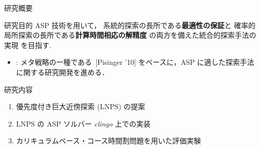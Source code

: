 \documentclass[11pt,dvipdfmx]{beamer}
\begin{document}
\begin{frame}{研究概要}
  \begin{alertblock}{研究目的}\centering
    ASP 技術を用いて，
   系統的探索の長所である\alert{\bf 最適性の保証}と
   確率的局所探索の長所である\alert{\bf 計算時間相応の解精度}
   の両方を備えた統合的探索手法の実現
   を目指す.
  \end{alertblock}

  \begin{itemize}
  \item {}:
    メタ戦略の一種である~[Pisinger '10]
    をベースに，ASP に適した探索手法に関する研究開発を進める．
  \end{itemize}

  \begin{block}{研究内容}
    \begin{enumerate}
    \item 優先度付き巨大近傍探索 (LNPS) の提案
    \item LNPS の ASP ソルバー \textit{clingo} 上での実装
    \item カリキュラムベース・コース時間割問題を用いた評価実験
    \end{enumerate}
  \end{block}
\end{frame}
\end{document}
